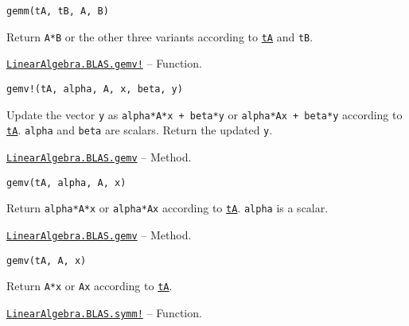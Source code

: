 \begin{adjustwidth}{2em}{0pt}


\begin{verbatim}
gemm(tA, tB, A, B)
\end{verbatim}

Return \texttt{A*B} or the other three variants according to \hyperlink{15951037910221396131}{\texttt{tA}} and \texttt{tB}.



\end{adjustwidth}
\hypertarget{11474194682797565787}{}
\hyperlink{11474194682797565787}{\texttt{LinearAlgebra.BLAS.gemv!}}  -- {Function.}

\begin{adjustwidth}{2em}{0pt}


\begin{verbatim}
gemv!(tA, alpha, A, x, beta, y)
\end{verbatim}

Update the vector \texttt{y} as \texttt{alpha*A*x + beta*y} or \texttt{alpha*A{\textquotesingle}x + beta*y} according to \hyperlink{15951037910221396131}{\texttt{tA}}. \texttt{alpha} and \texttt{beta} are scalars. Return the updated \texttt{y}.



\end{adjustwidth}
\hypertarget{8345832657519601563}{}
\hyperlink{8345832657519601563}{\texttt{LinearAlgebra.BLAS.gemv}}  -- {Method.}

\begin{adjustwidth}{2em}{0pt}


\begin{verbatim}
gemv(tA, alpha, A, x)
\end{verbatim}

Return \texttt{alpha*A*x} or \texttt{alpha*A{\textquotesingle}x} according to \hyperlink{15951037910221396131}{\texttt{tA}}. \texttt{alpha} is a scalar.



\end{adjustwidth}
\hypertarget{9565605233626134323}{}
\hyperlink{9565605233626134323}{\texttt{LinearAlgebra.BLAS.gemv}}  -- {Method.}

\begin{adjustwidth}{2em}{0pt}


\begin{verbatim}
gemv(tA, A, x)
\end{verbatim}

Return \texttt{A*x} or \texttt{A{\textquotesingle}x} according to \hyperlink{15951037910221396131}{\texttt{tA}}.



\end{adjustwidth}
\hypertarget{8132740051631912637}{}
\hyperlink{8132740051631912637}{\texttt{LinearAlgebra.BLAS.symm!}}  -- {Function.}

